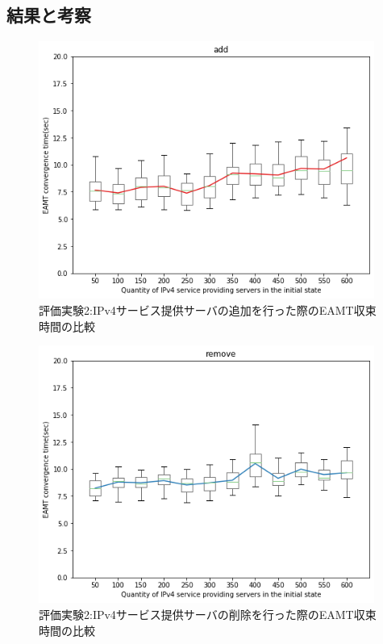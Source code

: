 \subsection{結果と考察}
\label{evaluation:eval2:result}
\begin{figure}[h]
    \begin{center}
    \includegraphics[width=11cm,pagebox=cropbox,clip]{img/eval2_result_add.png}
    \end{center}
    \caption{評価実験2:IPv4サービス提供サーバの追加を行った際のEAMT収束時間の比較}
    \label{fig:eval2_result_add}
\end{figure}

\begin{figure}[h]
    \begin{center}
    \includegraphics[width=11cm,pagebox=cropbox,clip]{img/eval2_result_remove.png}
    \end{center}
    \caption{評価実験2:IPv4サービス提供サーバの削除を行った際のEAMT収束時間の比較}
    \label{fig:eval2_result_remove}
\end{figure}

